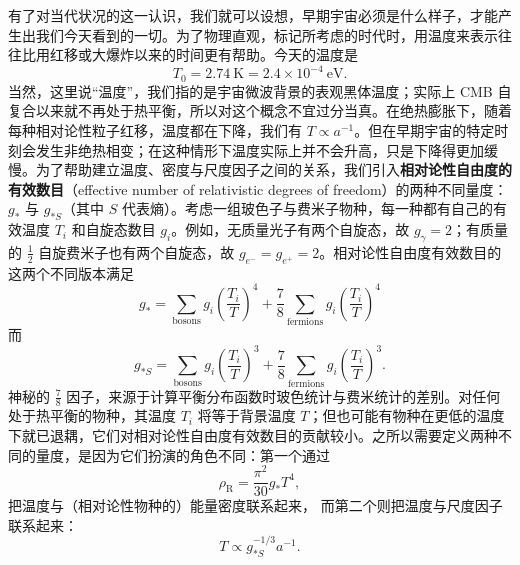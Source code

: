 有了对当代状况的这一认识，我们就可以设想，早期宇宙必须是什么样子，才能产生出我们今天看到的一切。为了物理直观，标记所考虑的时代时，用温度来表示往往比用红移或大爆炸以来的时间更有帮助。今天的温度是
\begin{equation*}
T_0 = 2.74\ \mathrm{K} = 2.4\times 10^{-4}\ \mathrm{eV}.
\tag{8.171}
\end{equation*}
当然，这里说“温度”，我们指的是宇宙微波背景的表观黑体温度；实际上 CMB 自复合以来就不再处于热平衡，所以对这个概念不宜过分当真。在绝热膨胀下，随着每种相对论性粒子红移，温度都在下降，我们有 $T\propto a^{-1}$。但在早期宇宙的特定时刻会发生非绝热相变；在这种情形下温度实际上并不会升高，只是下降得更加缓慢。为了帮助建立温度、密度与尺度因子之间的关系，我们引入\textbf{相对论性自由度的有效数目}（effective number of relativistic degrees of freedom）的两种不同量度：$g_{*}$ 与 $g_{*S}$（其中 $S$ 代表熵）。考虑一组玻色子与费米子物种，每一种都有自己的有效温度 $T_i$ 和自旋态数目 $g_i$。例如，无质量光子有两个自旋态，故 $g_{\gamma}=2$；有质量的 $\frac{1}{2}$ 自旋费米子也有两个自旋态，故 $g_{e^-}=g_{e^+}=2$。相对论性自由度有效数目的这两个不同版本满足
\begin{equation*}
g_{*} = \sum_{\mathrm{bosons}} g_i\left(\frac{T_i}{T}\right)^{4} + \frac{7}{8}\sum_{\mathrm{fermions}} g_i\left(\frac{T_i}{T}\right)^{4}
\tag{8.172}
\end{equation*}
而
\begin{equation*}
g_{*S} = \sum_{\mathrm{bosons}} g_i\left(\frac{T_i}{T}\right)^{3} + \frac{7}{8}\sum_{\mathrm{fermions}} g_i\left(\frac{T_i}{T}\right)^{3}.
\tag{8.173}
\end{equation*}
神秘的 $\frac{7}{8}$ 因子，来源于计算平衡分布函数时玻色统计与费米统计的差别。对任何处于热平衡的物种，其温度 $T_i$ 将等于背景温度 $T$；但也可能有物种在更低的温度下就已退耦，它们对相对论性自由度有效数目的贡献较小。之所以需要定义两种不同的量度，是因为它们扮演的角色不同：第一个通过
\begin{equation*}
\rho_{\mathrm{R}} = \frac{\pi^{2}}{30}g_{*}T^{4},
\tag{8.174}
\end{equation*}
把温度与（相对论性物种的）能量密度联系起来，
而第二个则把温度与尺度因子联系起来：
\begin{equation*}
T \propto g_{*S}^{-1/3}a^{-1}.
\tag{8.175}
\end{equation*}


